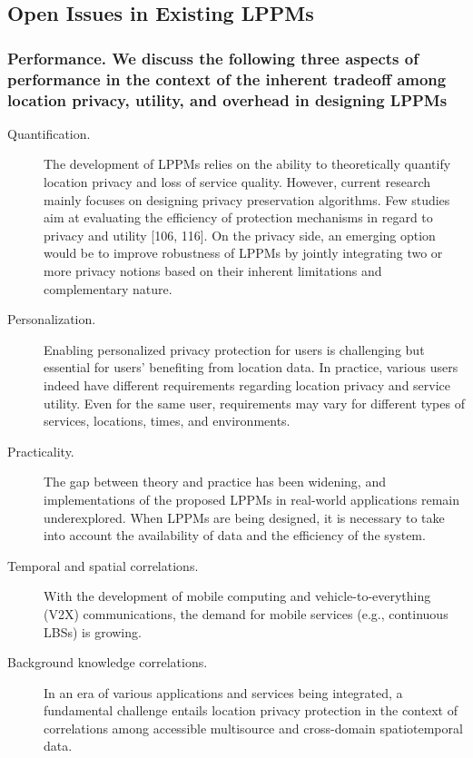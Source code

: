 \documentclass{acmart}
\begin{document}
\subsection{Open Issues in Existing LPPMs}
\subsubsection{Performance. We discuss the following three aspects of performance in the context of the inherent tradeoff among location privacy, utility, and overhead in designing LPPMs}
\begin{description}
    
    \item[Quantification.]The development of LPPMs relies on the ability to theoretically quantify location privacy and loss of service quality.  However, current research mainly focuses on designing privacy preservation algorithms. Few studies aim at evaluating the efficiency of protection mechanisms in regard to privacy and utility [106, 116]. On the privacy side, an emerging option would be to improve robustness of LPPMs by jointly integrating two or more privacy notions based on their inherent limitations and complementary nature. 
    \item[Personalization.]Enabling personalized privacy protection for users is challenging but essential for users’ benefiting from location data. In practice, various users indeed have different requirements regarding location privacy and service utility. Even for the same user, requirements may vary for different types of services, locations, times, and environments.
    \item[Practicality.]The gap between theory and practice has been widening, and implementations of the proposed LPPMs in real-world applications remain underexplored. When LPPMs are being designed, it is necessary to take into account the availability of data and the efficiency of the system. 
    \item[Temporal and spatial correlations.]With the development of mobile computing and vehicle-to-everything (V2X) communications, the demand for mobile services (e.g., continuous LBSs) is growing.
    \item[Background knowledge correlations.]In an era of various applications and services being integrated, a fundamental challenge entails location privacy protection in the context of correlations among accessible multisource and cross-domain spatiotemporal data.

\end{description}
\end{document}
